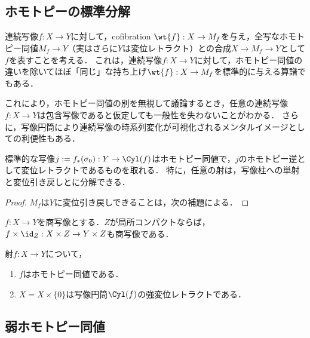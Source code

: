 \documentclass[uplatex, dvipdfmx]{jsreport}
\begin{document}
\subsection{ホモトピーの標準分解}

\begin{tcolorbox}[colframe=ForestGreen, colback=ForestGreen!10!white,breakable,colbacktitle=ForestGreen!40!white,coltitle=black,fonttitle=\bfseries\sffamily,
title=リフトとホモトピー同値とに分けて考える]
    連続写像$f:X\to Y$に対して，cofibration $\wt{f}:X\to M_f$を与え，全写なホモトピー同値$M_f\to Y$（実はさらに$Y$は変位レトラクト）との合成$X\to M_f\to Y$として$f$を表すことを考える．
    これは，連続写像$f:X\to Y$に対して，ホモトピー同値の違いを除いてほぼ「同じ」な持ち上げ$\wt{f}:X\to M_f$を標準的に与える算譜でもある．

    これにより，ホモトピー同値の別を無視して議論するとき，任意の連続写像$f:X\to Y$は包含写像であると仮定しても一般性を失わないことがわかる．
    さらに，写像円筒により連続写像の時系列変化が可視化されるメンタルイメージとしての利便性もある．
\end{tcolorbox}

\begin{theorem}[ホモトピー標準分解]\label{thm-cannonical-decomposition-of-continuous-map}
    標準的な写像$j:=f_*(\sigma_0):Y\to\Cyl(f)$はホモトピー同値で，$j$のホモトピー逆として変位レトラクトであるものを取れる．
    特に，任意の射は，写像柱への単射と変位引き戻しとに分解できる．
\end{theorem}
\begin{proof}
    $M_f$は$Y$に変位引き戻しできることは，次の補題による．
\end{proof}
\begin{lemma}[商空間と積空間]
    $f:X\to Y$を商写像とする．$Z$が局所コンパクトならば，$f\times\id_Z:X\times Z\to Y\times Z$も商写像である．
\end{lemma}

\begin{theorem}[ホモトピー同値の特徴付け]\label{thm-characterization-of-homotopy-equivalence}
    射$f:X\to Y$について，
    \begin{enumerate}
        \item $f$はホモトピー同値である．
        \item $X=X\times\{0\}$は写像円筒$\Cyl(f)$の強変位レトラクトである．
    \end{enumerate}
\end{theorem}

\subsection{弱ホモトピー同値}
\end{document}
